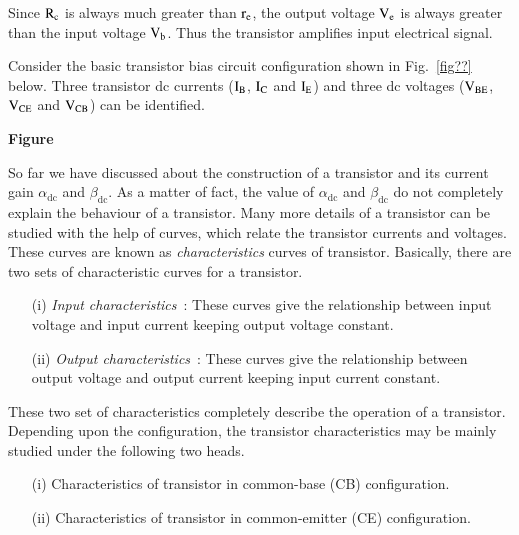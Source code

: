 Since $\textrm{R}_{\textrm{c}}$ is always much greater than $\textrm{r}_{\textrm{e}}$, the output voltage $\textrm{V}_{\textrm{e}}$ is always greater than the input voltage $\textrm{V}_{\textrm{b}}$. Thus the transistor amplifies input electrical signal.

\begin{note}
Consider the basic transistor bias circuit configuration shown in Fig.~\ref{fig??} below. Three transistor dc currents ($\textrm{I}_{\textrm{B}}$, $\textrm{I}_{\textrm{C}}$ and $\textrm{I}_{\textrm{E}}$) and three dc voltages ($\textrm{V}_{\text{BE}}$, $\textrm{V}_{\text{CE}}$ and $\textrm{V}_{\text{CB}}$) can be identified.
\begin{center}
{\bf Figure}
\end{center}
\end{note}


So far we have discussed about the construction of a transistor and its current gain $\alpha_{\text{dc}}$ and $\beta_{\text{dc}}$. As a matter of fact, the value of $\alpha_{\text{dc}}$ and $\beta_{\text{dc}}$ do not completely explain the behaviour of a transistor. Many more details of a transistor can be studied with the help of curves, which relate the transistor currents and voltages. These curves are known as {\em characteristics} curves of transistor. Basically, there are two sets of characteristic curves for a transistor.
\begin{itemize}
\item[(i)] {\em Input characteristics}~: These curves give the relationship between input voltage and input current keeping output voltage constant.

\item[(ii)] {\em Output characteristics}~: These curves give the relationship between output voltage and output current keeping input current constant.
\end{itemize}

These two set of characteristics completely describe the operation of a transistor. Depending upon the configuration, the transistor characteristics may be mainly studied under the following two heads.
\begin{itemize}
\item[(i)] Characteristics of transistor in common-base (CB) configuration.

\item[(ii)] Characteristics of transistor in common-emitter (CE) configuration.
\end{itemize}


